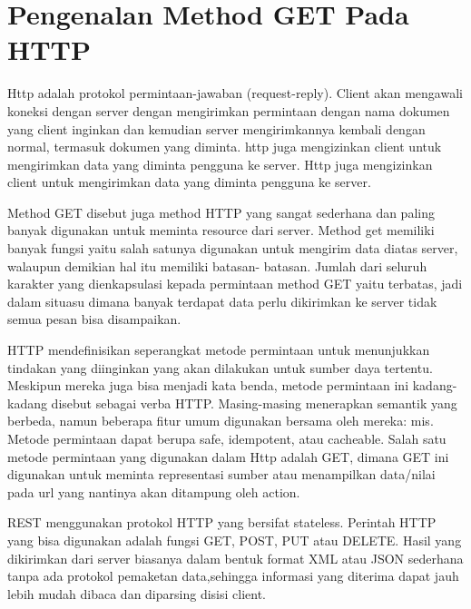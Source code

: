
\section{Pengenalan Method GET Pada HTTP}
Http adalah protokol permintaan-jawaban (request-reply). Client akan mengawali koneksi dengan server dengan mengirimkan permintaan dengan nama dokumen yang client inginkan dan kemudian server mengirimkannya kembali dengan normal, termasuk dokumen yang diminta. http juga mengizinkan client untuk mengirimkan data yang diminta pengguna ke server. Http juga mengizinkan client untuk mengirimkan data yang diminta pengguna ke server. 

Method GET disebut juga method HTTP yang sangat sederhana dan paling banyak digunakan untuk meminta resource dari server. Method get 
memiliki banyak fungsi yaitu salah satunya digunakan untuk mengirim data diatas server, walaupun demikian hal itu memiliki batasan-
batasan. Jumlah dari seluruh karakter yang dienkapsulasi kepada permintaan method GET yaitu terbatas, jadi dalam situasu dimana banyak 
terdapat data perlu dikirimkan ke server tidak semua pesan bisa disampaikan. 

HTTP mendefinisikan seperangkat metode permintaan untuk menunjukkan tindakan yang diinginkan yang akan dilakukan untuk sumber daya 
tertentu.
Meskipun mereka juga bisa menjadi kata benda, metode permintaan ini kadang-kadang disebut sebagai verba HTTP. Masing-masing menerapkan 
semantik yang berbeda, namun beberapa fitur umum digunakan bersama oleh mereka: mis. Metode permintaan dapat berupa safe, idempotent, atau cacheable. 
Salah satu metode permintaan yang digunakan dalam Http adalah GET, dimana GET ini digunakan untuk meminta representasi sumber atau 
menampilkan data/nilai pada url yang nantinya akan ditampung oleh action.

REST menggunakan protokol HTTP yang bersifat stateless. Perintah HTTP yang bisa digunakan adalah fungsi GET, POST, PUT atau 
DELETE. Hasil yang dikirimkan dari server biasanya dalam bentuk format XML atau JSON sederhana tanpa ada protokol pemaketan  
data,sehingga informasi yang diterima dapat jauh lebih mudah dibaca dan diparsing disisi client.

